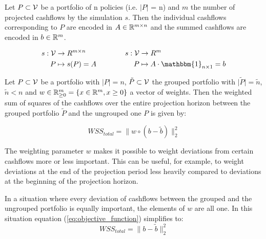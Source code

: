 \begin{definition}
	Let $P \subset \mathcal{V}$ be a portfolio of n policies (i.e. $\vert P \vert$ = n) and $m$ the number of projected cashflows by the simulation $s$. Then the individual cashflows corresponding to $P$ are encoded in $A \in \mathbb{R}^{m \times n}$ and the summed cashflows are encoded in $b \in \mathbb{R}^m$.

	\begin{equation*}
	\begin{aligned}[c]
	s: \V &\rightarrow R^{m \times n}\\
		P & \mapsto s(P)=A\\
	\end{aligned}
	\qquad \qquad
	\begin{aligned}[c]
	s: \V &\rightarrow R^m\\
		P & \mapsto A \cdot \mathbbm{1}_{n \times 1} = b \\
	\end{aligned}
	\end{equation*}
	
\end{definition}

\begin{definition}
	Let $P \subset \mathcal{V}$ be a portfolio with $\vert P \vert = n$, $\tilde{P} \subset \mathcal{V}$  the grouped portfolio with $\vert \tilde{P} \vert = \tilde{n}$, $\tilde{n} < n$ and $w \in \mathbb{R}^m_{\geq 0} = \{x \in \mathbb{R}^m, x \geq 0\}$ a vector of weights. Then the weighted sum of squares of the cashflows over the entire projection horizon between the grouped portfolio $\tilde{P}$ and the ungrouped one $P$ is given by: 
	
	\begin{equation}\label{eq:objective_function}
		WSS_{total} = \lVert w \circ (b - \tilde{b})\lVert_2^2
	\end{equation}
\end{definition}

The weighting parameter $w$ makes it possible to weight deviations from certain cashflows more or less important. This can be useful, for example, to weight deviations at the end of the projection period less heavily compared to deviations at the beginning of the projection horizon.

\begin{remark}
	In a situation where every deviation of cashflows between the grouped and the ungrouped portfolio is equally important, the elements of $w$ are all one. In this situation equation (\ref{eq:objective_function}) simplifies to:	
	\begin{equation}\label{eq:objective_function_simple}
		WSS_{total} = \lVert b - \tilde{b}\lVert_2^2
	\end{equation}
	
\end{remark}

